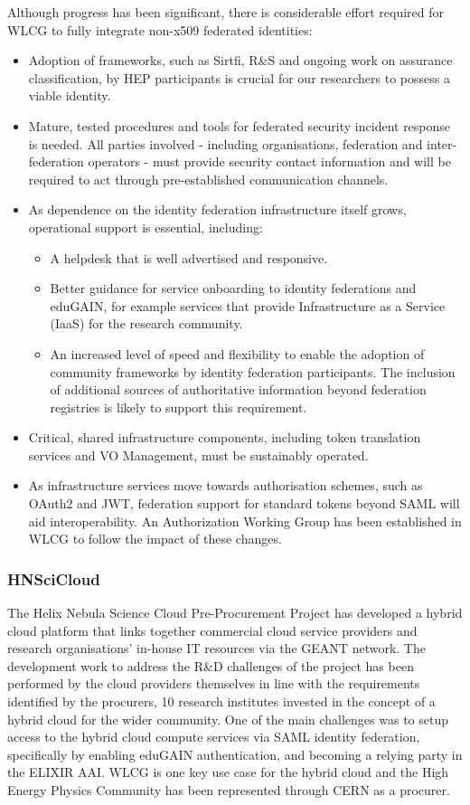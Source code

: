 \documentclass[fleqn,11pt]{wlscirep}
\begin{document}
{Although progress has been significant, there is considerable effort required for WLCG to fully integrate non-x509 federated identities:
\begin{itemize}
\item Adoption of frameworks, such as Sirtfi, R\&S and ongoing work on assurance classification, by HEP participants is crucial for our researchers to possess a viable identity. 
\item Mature, tested procedures and tools for federated security incident response is needed. All parties involved - including organisations, federation and inter-federation operators - must provide security contact information and will be required to act through pre-established communication channels.
\item As dependence on the identity federation infrastructure itself grows, operational support is essential, including:
\begin{itemize}
\item A helpdesk that is well advertised and responsive.
\item Better guidance for service onboarding to identity federations and eduGAIN, for example services that provide Infrastructure as a Service (IaaS) for the research community.
\item An increased level of speed and flexibility to enable the adoption of community frameworks by identity federation participants. The inclusion of additional sources of authoritative information beyond federation registries is likely to support this requirement.
\end{itemize}
\item Critical, shared infrastructure components, including token translation services and VO Management, must be sustainably operated.
\item As infrastructure services move towards authorisation schemes, such as OAuth2 and JWT, federation support for standard tokens beyond SAML will aid interoperability. An Authorization Working Group has been established in WLCG to follow the impact of these changes.

\end{itemize}

\subsubsection{HNSciCloud}
The Helix Nebula Science Cloud Pre-Procurement Project\cite{hnscicloud} has developed a hybrid cloud platform that links together commercial cloud service providers and research organisations’ in-house IT resources via the GEANT network. The development work to address the R\&D challenges of the project has been performed by the cloud providers themselves in line with the requirements identified by the procurers, 10 research institutes invested in the concept of a hybrid cloud for the wider community. One of the main challenges was to setup access to the hybrid cloud compute services via SAML identity federation, specifically by enabling eduGAIN authentication, and becoming a relying party in the ELIXIR AAI. WLCG is one key use case for the hybrid cloud and the High Energy Physics Community has been represented through CERN as a procurer. 

}
\end{document}
